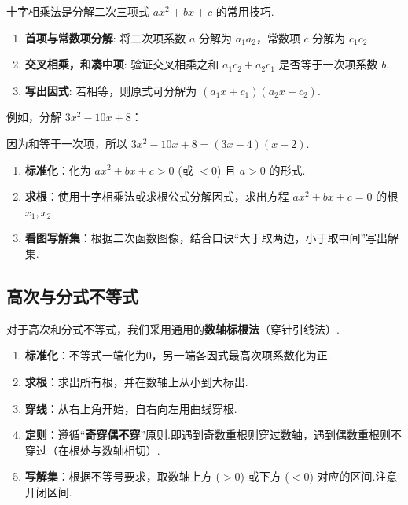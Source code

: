 \begin{definition}[十字相乘法]
	十字相乘法是分解二次三项式 $ax^2+bx+c$ 的常用技巧.
	\begin{enumerate}
		\item \textbf{首项与常数项分解}: 将二次项系数 $a$ 分解为 $a_1 a_2$，常数项 $c$ 分解为 $c_1 c_2$.
		\item \textbf{交叉相乘，和凑中项}: 验证交叉相乘之和 $a_1 c_2 + a_2 c_1$ 是否等于一次项系数 $b$.
		\item \textbf{写出因式}: 若相等，则原式可分解为 $(a_1x + c_1)(a_2x + c_2)$.
	\end{enumerate}
	例如，分解 $3x^2-10x+8$：
	\begin{center}
	\end{center}
	因为和等于一次项，所以 $3x^2-10x+8 = (3x-4)(x-2)$.
\end{definition}

\begin{note}[解一元二次不等式的三步法]
	\begin{enumerate}
		\item \textbf{标准化}：化为 $ax^2+bx+c > 0$ (或 $<0$) 且 $a>0$ 的形式.
		\item \textbf{求根}：使用十字相乘法或求根公式分解因式，求出方程 $ax^2+bx+c=0$ 的根 $x_1, x_2$.
		\item \textbf{看图写解集}：根据二次函数图像，结合口诀“大于取两边，小于取中间”写出解集.
	\end{enumerate}
\end{note}

\subsection{高次与分式不等式}

对于高次和分式不等式，我们采用通用的\textbf{数轴标根法}（穿针引线法）.

\begin{definition}[数轴标根法]
	\begin{enumerate}
		\item \textbf{标准化}：不等式一端化为0，另一端各因式最高次项系数化为正.
		\item \textbf{求根}：求出所有根，并在数轴上从小到大标出.
		\item \textbf{穿线}：从右上角开始，自右向左用曲线穿根.
		\item \textbf{定则}：遵循“\textbf{奇穿偶不穿}”原则.即遇到奇数重根则穿过数轴，遇到偶数重根则不穿过（在根处与数轴相切）.
		\item \textbf{写解集}：根据不等号要求，取数轴上方 ($>0$) 或下方 ($<0$) 对应的区间.注意开闭区间.
	\end{enumerate}
\end{definition}

